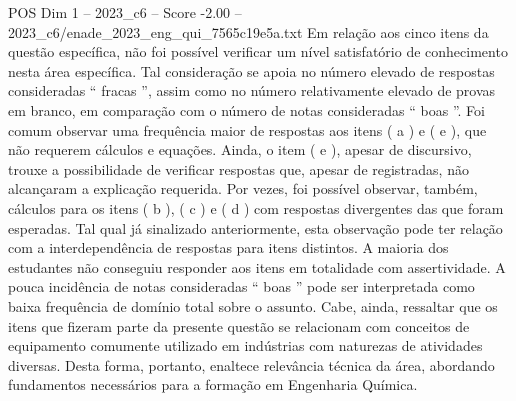 \begin{textsample}{POS Dim 1 – 2023\_c6 – Score -2.00 – 2023\_c6/enade\_2023\_eng\_qui\_7565c19e5a.txt}
Em relação aos cinco itens da questão específica, não foi possível verificar um nível satisfatório de conhecimento nesta área específica.
Tal consideração se apoia no número elevado de respostas consideradas “ fracas ”, assim como no número relativamente elevado de provas em branco, em comparação com o número de notas consideradas “ boas ”.
Foi comum observar uma frequência maior de respostas aos itens ( a ) e ( e ), que não requerem cálculos e equações.
Ainda, o item ( e ), apesar de discursivo, trouxe a possibilidade de verificar respostas que, apesar de registradas, não alcançaram a explicação requerida.
Por vezes, foi possível observar, também, cálculos para os itens ( b ), ( c ) e ( d ) com respostas divergentes das que foram esperadas.
Tal qual já sinalizado anteriormente, esta observação pode ter relação com a interdependência de respostas para itens distintos.
A maioria dos estudantes não conseguiu responder aos itens em totalidade com assertividade.
A pouca incidência de notas consideradas “ boas ” pode ser interpretada como baixa frequência de domínio total sobre o assunto.
Cabe, ainda, ressaltar que os itens que fizeram parte da presente questão se relacionam com conceitos de equipamento comumente utilizado em indústrias com naturezas de atividades diversas.
Desta forma, portanto, enaltece relevância técnica da área, abordando fundamentos necessários para a formação em Engenharia Química.

\end{textsample}
